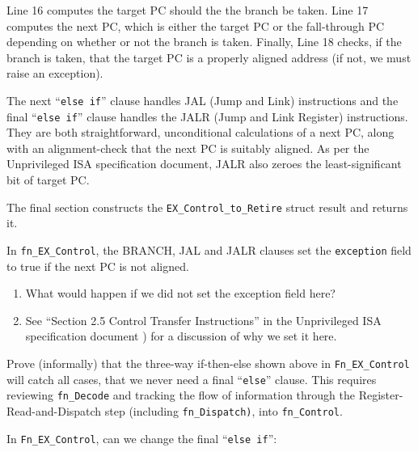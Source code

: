 Line 16 computes the target PC should the the branch be taken.  Line
17 computes the next PC, which is either the target PC or the
fall-through PC depending on whether or not the branch is taken.
Finally, Line 18 checks, if the branch is taken, that the target PC is
a properly aligned address (if not, we must raise an exception).

The next ``\verb|else if|'' clause handles JAL (Jump and Link)
instructions and the final ``\verb|else if|'' clause handles the JALR
(Jump and Link Register) instructions.  They are both straightforward,
unconditional calculations of a next PC, along with an alignment-check
that the next PC is suitably aligned.  As per the Unprivileged ISA
specification document, JALR also zeroes the least-significant bit of
target PC.

The final section constructs the \verb|EX_Control_to_Retire| struct
result and returns it.

\vspace*{2ex}

\hdivider

\Exercise

In {\tt fn\_EX\_Control}, the BRANCH, JAL and JALR clauses set the
{\tt exception} field to true if the next PC is not aligned.

\begin{enumerate}

  \item What would happen if we did not set the exception field here?

  \item See ``Section 2.5 Control Transfer Instructions'' in the
      Unprivileged ISA specification document
      \cite{RISCV_Unpriv_2019_12_13}) for a discussion of why we set
      it here.

\end{enumerate}

\Exercise

Prove (informally) that the three-way if-then-else shown above in
\verb|Fn_EX_Control| will catch all cases, {\ie} that we never need a
final ``\verb|else|'' clause.  This requires reviewing
\verb|fn_Decode| and tracking the flow of information through the
Register-Read-and-Dispatch step (including \verb|fn_Dispatch)|, into
\verb|fn_Control|.

\Exercise

In \verb|Fn_EX_Control|, can we change the final ``\verb|else if|'':

